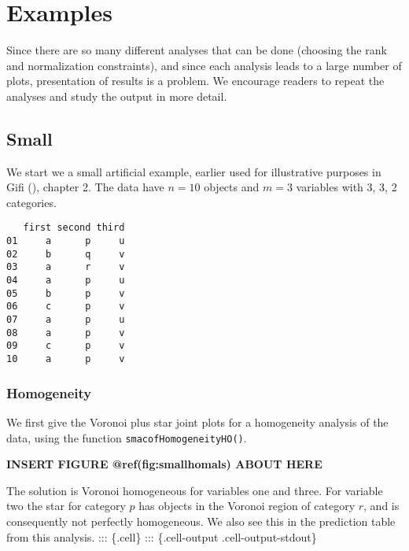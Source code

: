 \documentclass[
  12pt,
  letterpaper,
  DIV=11,
  numbers=noendperiod]{scrartcl}
\begin{document}
\section{Examples}\label{examples}

Since there are so many different analyses that can be done (choosing
the rank and normalization constraints), and since each analysis leads
to a large number of plots, presentation of results is a problem. We
encourage readers to repeat the analyses and study the output in more
detail.

\subsection{Small}\label{small}

We start we a small artificial example, earlier used for illustrative
purposes in Gifi (), chapter 2. The data
have \(n=10\) objects and \(m=3\) variables with 3, 3, 2 categories.

\begin{verbatim}
   first second third
01     a      p     u
02     b      q     v
03     a      r     v
04     a      p     u
05     b      p     v
06     c      p     v
07     a      p     u
08     a      p     v
09     c      p     v
10     a      p     v
\end{verbatim}

\subsubsection{Homogeneity}\label{homogeneity}

We first give the Voronoi plus star joint plots for a homogeneity
analysis of the data, using the function \texttt{smacofHomogeneityHO()}.

\begin{greybox}

\begin{center}
\textbf{INSERT FIGURE @ref(fig:smallhomals) ABOUT HERE}

\end{center}

\end{greybox}

The solution is Voronoi homogeneous for variables one and three. For
variable two the star for category \(p\) has objects in the Voronoi
region of category \(r\), and is consequently not perfectly homogeneous.
We also see this in the prediction table from this analysis. :::
\{.cell\} ::: \{.cell-output .cell-output-stdout\}
\end{document}
